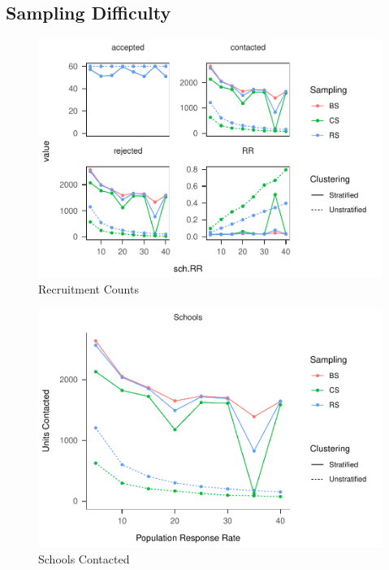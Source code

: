 \documentclass[man,floatsintext]{apa6}
\begin{document}
\hypertarget{sampling-difficulty}{%
\subsection{Sampling Difficulty}\label{sampling-difficulty}}

\begin{figure}
\centering
\includegraphics{Results_files/figure-latex/unnamed-chunk-8-1.pdf}
\caption{\label{fig:unnamed-chunk-8}Recruitment Counts}
\end{figure}

\begin{figure}
\centering
\includegraphics{Results_files/figure-latex/unnamed-chunk-9-1.pdf}
\caption{\label{fig:unnamed-chunk-9}Schools Contacted}
\end{figure}
\end{document}

